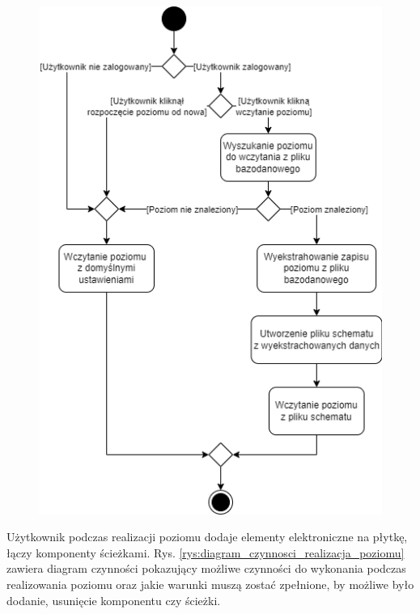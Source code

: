 \documentclass[12pt,a4paper]{article} %
\begin{document}
\begin{figure}[h]
\begin{minipage}{.5\textwidth}
	  \includegraphics[width=.8\textwidth]{images/diagramy_czynnosci/plan-diagram_czynnosci_wczytaj_poziom.png}
	  \label{rys:diagram_czynnosci_wczytaj_poziom}
	\end{minipage}
\end{figure}

\aka Użytkownik podczas realizacji poziomu dodaje elementy elektroniczne na płytkę, łączy komponenty ścieżkami. Rys. \ref{rys:diagram_czynnosci_realizacja_poziomu} zawiera diagram czynności pokazujący możliwe czynności do wykonania podczas realizowania poziomu oraz jakie warunki muszą zostać zpełnione, by możliwe było dodanie, usunięcie komponentu czy ścieżki.
\end{document}

